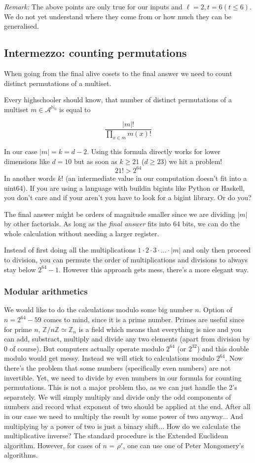 \documentclass[]{article}
\newcommand{\NN}{\mathbb N}
\newcommand{\ZZ}{\mathbb Z}
\newcommand{\calA}{\mathcal A}
\begin{document}
	\emph{Remark:} The above points are only true for our inputs and $\ell=2, t=6 (t \leq 6)$. We do not yet understand where they come from or how much they can be generalised.
	
	\subsection{Intermezzo: counting permutations}
	When going from the final alive cosets to the final answer we need to count distinct permutations of a multiset.
	
	Every highschooler should know, that number of distinct permutations of a multiset $m \in \calA ^{\NN_0}$ is equal to 
	
	$$\frac{|m|!}{\prod_{x\in m} m(x)!}$$
	
	In our case $|m| = k = d-2$.
	Using this formula directly works for lower dimensions like $d=10$ but as soon as $k \geq 21$ ($d \geq 23$) we hit a problem!
	$$21! > 2^{64}$$
	In another words $k!$ (an intermediate value in our computation doesn't fit into a uint64). If you are using a language with buildin bigints like Python or Haskell, you don't care and if your aren't you have to look for a bigint library. Or do you?
	
	The final answer might be orders of magnitude smaller since we are dividing $|m|$ by other factorials. As long as the \emph{final answer} fits into 64 bits, we can do the whole calculation without needing a larger register.
	
	Instead of first doing all the multiplications $1 \cdot 2\cdot 3\cdot \dots\cdot |m|$ and only then proceed to division, you can permute the order of multiplications and divisions to always stay below $2^{64}-1$. However this approach gets mess, there's a more elegant way.
	
	\subsubsection{Modular arithmetics}
	We would like to do the calculations modulo some big number $n$. Option of $n=2^{64}-59$ comes to mind, since it is a prime number. Primes are useful since for prime $n$, $\ZZ/n\ZZ \simeq \ZZ_n$ is a field which means that everything is nice and you can add, substract, multiply and divide any two elements (apart from division by 0 of course). But computers actually operate modulo $2^{64}$ (or $2^{32}$) and this double modulo would get messy.
	Instead we will stick to calculations modulo $2^{64}$. Now there's the problem that some numbers (specifically even numbers) are not invertible. Yet, we need to divide by even numbers in our formula for counting permutations. This is not a major problem tho, as we can just handle the 2's separately. We will simply multiply and divide only the odd components of numbers and record what exponent of two should be applied at the end. After all in our case  we need to multiply the result by some power of two anyway... And multiplying by a power of two is just a binary shift...
	How do we calculate the multiplicative inverse? The standard procedure is the Extended Euclidean algorithm. However, for cases of $n$ = $\rho^r$, one can use one of Peter Mongomery's algorithms.
	
\end{document}
